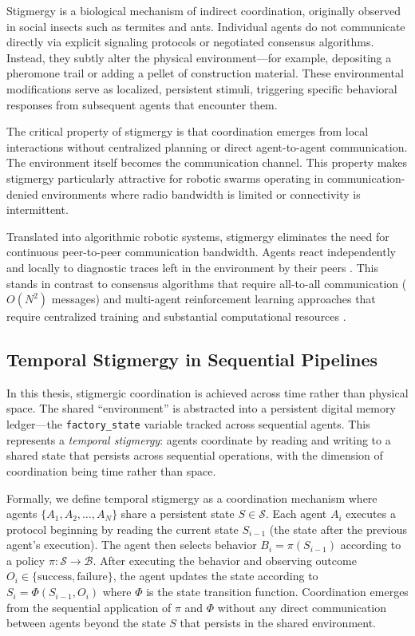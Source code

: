 \documentclass[12pt,a4paper,oneside]{report}
\begin{document}
Stigmergy is a biological mechanism of indirect coordination, originally observed in social insects such as termites and ants. Individual agents do not communicate directly via explicit signaling protocols or negotiated consensus algorithms. Instead, they subtly alter the physical environment---for example, depositing a pheromone trail or adding a pellet of construction material. These environmental modifications serve as localized, persistent stimuli, triggering specific behavioral responses from subsequent agents that encounter them.

The critical property of stigmergy is that coordination emerges from local interactions without centralized planning or direct agent-to-agent communication. The environment itself becomes the communication channel. This property makes stigmergy particularly attractive for robotic swarms operating in communication-denied environments where radio bandwidth is limited or connectivity is intermittent.

Translated into algorithmic robotic systems, stigmergy eliminates the need for continuous peer-to-peer communication bandwidth. Agents react independently and locally to diagnostic traces left in the environment by their peers \cite{bongard2006resilient}. This stands in contrast to consensus algorithms that require all-to-all communication ($O(N^2)$ messages) and multi-agent reinforcement learning approaches that require centralized training and substantial computational resources \cite{domberg2026selfadapting, daneshmand2026slowrl}.
\subsection{Temporal Stigmergy in Sequential Pipelines}
\label{subsec:temporal_stigmergy_in_sequential_pipelines}

In this thesis, stigmergic coordination is achieved across time rather than physical space. The shared ``environment'' is abstracted into a persistent digital memory ledger---the \texttt{factory\_state} variable tracked across sequential agents. This represents a \textit{temporal stigmergy}: agents coordinate by reading and writing to a shared state that persists across sequential operations, with the dimension of coordination being time rather than space.

Formally, we define temporal stigmergy as a coordination mechanism where agents $\{A_1, A_2, \ldots, A_N\}$ share a persistent state $S \in \mathcal{S}$. Each agent $A_i$ executes a protocol beginning by reading the current state $S_{i-1}$ (the state after the previous agent's execution). The agent then selects behavior $B_i = \pi(S_{i-1})$ according to a policy $\pi: \mathcal{S} \rightarrow \mathcal{B}$. After executing the behavior and observing outcome $O_i \in \{\text{success}, \text{failure}\}$, the agent updates the state according to $S_i = \Phi(S_{i-1}, O_i)$ where $\Phi$ is the state transition function. Coordination emerges from the sequential application of $\pi$ and $\Phi$ without any direct communication between agents beyond the state $S$ that persists in the shared environment.
\end{document}
